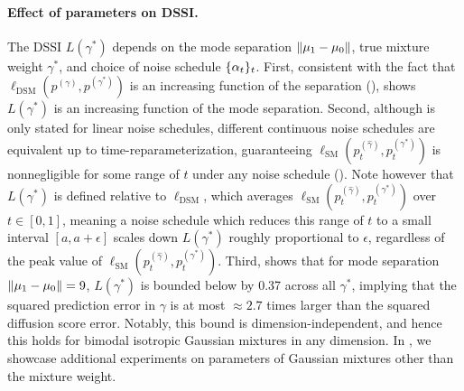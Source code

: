 \documentclass[11pt]{article}
\theoremstyle{plain}
\newcommand{\1}{\mathbbm{1}}
\DeclarePairedDelimiter{\norm}{\lVert}{\rVert}
\DeclarePairedDelimiter{\set}{\lbrace}{\rbrace}
\newcommand{\ldsm}{\ell_\mathrm{DSM}}
\newcommand{\lsm}{\ell_\mathrm{SM}}
\newcommand{\pdist}[2][]{p_{#1}^{(#2)}}
\begin{document}
\paragraph{Effect of parameters on DSSI.} The DSSI $L(\gamma^*)$ depends on the mode separation $\norm{\mu_1-\mu_0}$, true mixture weight $\gamma^*$, and choice of noise schedule $\set{\alpha_t}_t$. First, consistent with the fact that $\ldsm(\pdist{\gamma}, \pdist{\gamma^*})$ is an increasing function of the separation (),  shows $L(\gamma^*)$ is an increasing function of the mode separation. Second, although  is only stated for linear noise schedules, different continuous noise schedules are equivalent up to time-reparameterization, guaranteeing $\lsm(\pdist[t]{\hat\gamma}, \pdist[t]{\gamma^*})$ is nonnegligible for some range of $t$ under any noise schedule (). Note however that $L(\gamma^*)$ is defined relative to $\ldsm$, which averages $\lsm(\pdist[t]{\hat\gamma},\pdist[t]{\gamma^*})$ over $t\in[0,1]$, meaning a noise schedule which reduces this range of $t$ to a small interval $[a,a+\epsilon]$ scales down $L(\gamma^*)$ roughly proportional to $\epsilon$, regardless of the peak value of $\lsm(\pdist[t]{\hat\gamma},\pdist[t]{\gamma^*})$. 
Third,  shows that for mode separation $\norm{\mu_1-\mu_0}=9$, $L(\gamma^*)$ is bounded below by 0.37 across all $\gamma^*$, implying that the squared prediction error in $\gamma$ is at most $\approx 2.7$ times larger than the squared diffusion score error. Notably, this bound is dimension-independent, and hence this holds for bimodal isotropic Gaussian mixtures in any dimension. In , we showcase additional experiments on parameters of Gaussian mixtures other than the mixture weight. 


\end{document}
